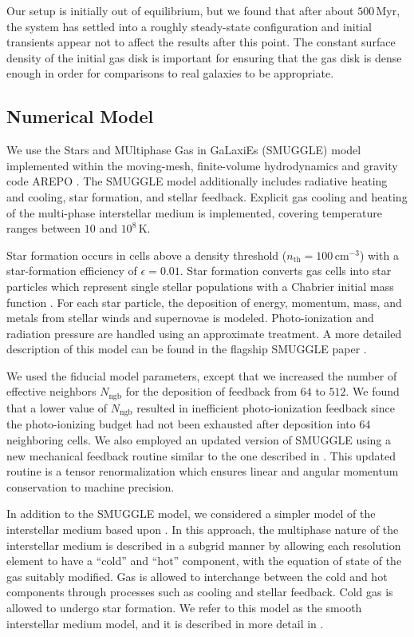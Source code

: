 \documentclass[twocolumn,linenumbers]{aastex631}
\newcommand{\AREPO}{\textsc{AREPO}}
\newcommand{\SMUGGLE}{SMUGGLE}
\begin{document}
Our setup is initially out of equilibrium, but we found that after about
$500\,\textrm{Myr}$, the system has settled into a roughly steady-state
configuration and initial transients appear not to affect the results after this
point. The constant surface density of the initial gas disk is important for
ensuring that the gas disk is dense enough in order for comparisons to real
galaxies to be appropriate.

\subsection{Numerical Model}
We use the Stars and MUltiphase Gas in GaLaxiEs (\SMUGGLE{}) model
\citep{2019MNRAS.489.4233M} implemented within the moving-mesh, finite-volume
hydrodynamics and gravity code \AREPO{} \citep{2010MNRAS.401..791S}. The \SMUGGLE{}
model additionally includes radiative heating and cooling, star formation, and
stellar feedback. Explicit gas cooling and heating of the multi-phase
interstellar medium is implemented, covering temperature ranges between $10$ and
$10^8\,\textrm{K}$.

Star formation occurs in cells above a density threshold
($n_{\textrm{th}}=100\,\textrm{cm}^{-3}$) with a star-formation efficiency of
$\epsilon = 0.01$. Star formation converts gas cells into star particles which
represent single stellar populations with a Chabrier initial mass function
\citep{2003PASP..115..763C}. For each star particle, the deposition of energy,
momentum, mass, and metals from stellar winds and supernovae is modeled.
Photo-ionization and radiation pressure are handled using an approximate
treatment. A more detailed description of this model can be found in the
flagship \SMUGGLE{} paper \citep{2019MNRAS.489.4233M}.

We used the fiducial model parameters, except that we increased the number of
effective neighbors $N_{\textrm{ngb}}$ for the deposition of feedback from $64$
to $512$. We found that a lower value of $N_{\textrm{ngb}}$ resulted in
inefficient photo-ionization feedback since the photo-ionizing budget had not
been exhausted after deposition into $64$ neighboring cells. We also employed an
updated version of \SMUGGLE{} using a new mechanical feedback routine similar to
the one described in \citet{2018MNRAS.480..800H}. This updated routine is a
tensor renormalization which ensures linear and angular momentum conservation to
machine precision.

In addition to the \SMUGGLE{} model, we considered a simpler model of the
interstellar medium based upon \citet{2003MNRAS.339..289S}. In this approach,
the multiphase nature of the interstellar medium is described in a subgrid
manner by allowing each resolution element to have a ``cold'' and ``hot''
component, with the equation of state of the gas suitably modified. Gas is
allowed to interchange between the cold and hot components through processes
such as cooling and stellar feedback. Cold gas is allowed to undergo star
formation. We refer to this model as the smooth interstellar medium model, and
it is described in more detail in \citet{2019MNRAS.489.4233M}.
\end{document}
